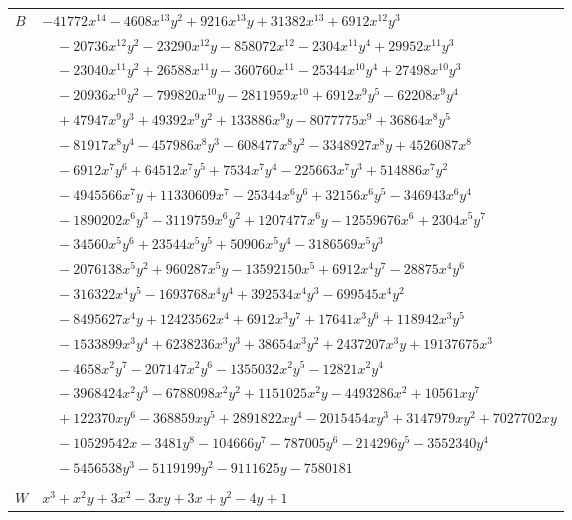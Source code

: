 \documentclass[11pt]{article}
\begin{document}
\begin{longtable}{@{}ll@{}}
$B$ & $-41772x^{14}-4608x^{13}y^{2}+9216x^{13}y+31382x^{13}+6912x^{12}y^{3}$\\
 & $\quad -20736x^{12}y^{2}-23290x^{12}y-858072x^{12}-2304x^{11}y^{4}+29952x^{11}y^{3}$\\
 & $\quad -23040x^{11}y^{2}+26588x^{11}y-360760x^{11}-25344x^{10}y^{4}+27498x^{10}y^{3}$\\
 & $\quad -20936x^{10}y^{2}-799820x^{10}y-2811959x^{10}+6912x^{9}y^{5}-62208x^{9}y^{4}$\\
 & $\quad +47947x^{9}y^{3}+49392x^{9}y^{2}+133886x^{9}y-8077775x^{9}+36864x^{8}y^{5}$\\
 & $\quad -81917x^{8}y^{4}-457986x^{8}y^{3}-608477x^{8}y^{2}-3348927x^{8}y+4526087x^{8}$\\
 & $\quad -6912x^{7}y^{6}+64512x^{7}y^{5}+7534x^{7}y^{4}-225663x^{7}y^{3}+514886x^{7}y^{2}$\\
 & $\quad -4945566x^{7}y+11330609x^{7}-25344x^{6}y^{6}+32156x^{6}y^{5}-346943x^{6}y^{4}$\\
 & $\quad -1890202x^{6}y^{3}-3119759x^{6}y^{2}+1207477x^{6}y-12559676x^{6}+2304x^{5}y^{7}$\\
 & $\quad -34560x^{5}y^{6}+23544x^{5}y^{5}+50906x^{5}y^{4}-3186569x^{5}y^{3}$\\
 & $\quad -2076138x^{5}y^{2}+960287x^{5}y-13592150x^{5}+6912x^{4}y^{7}-28875x^{4}y^{6}$\\
 & $\quad -316322x^{4}y^{5}-1693768x^{4}y^{4}+392534x^{4}y^{3}-699545x^{4}y^{2}$\\
 & $\quad -8495627x^{4}y+12423562x^{4}+6912x^{3}y^{7}+17641x^{3}y^{6}+118942x^{3}y^{5}$\\
 & $\quad -1533899x^{3}y^{4}+6238236x^{3}y^{3}+38654x^{3}y^{2}+2437207x^{3}y+19137675x^{3}$\\
 & $\quad -4658x^{2}y^{7}-207147x^{2}y^{6}-1355032x^{2}y^{5}-12821x^{2}y^{4}$\\
 & $\quad -3968424x^{2}y^{3}-6788098x^{2}y^{2}+1151025x^{2}y-4493286x^{2}+10561xy^{7}$\\
 & $\quad +122370xy^{6}-368859xy^{5}+2891822xy^{4}-2015454xy^{3}+3147979xy^{2}+7027702xy$\\
 & $\quad -10529542x-3481y^{8}-104666y^{7}-787005y^{6}-214296y^{5}-3552340y^{4}$\\
 & $\quad -5456538y^{3}-5119199y^{2}-9111625y-7580181$\\
\addlinespace[3pt]
\multicolumn{2}{@{}l}{$i=121$, $m=2$, neighbours $26,118$}\\
$W$ & $x^{3}+x^{2}y+3x^{2}-3xy+3x+y^{2}-4y+1$\\

\end{longtable}
\end{document}
